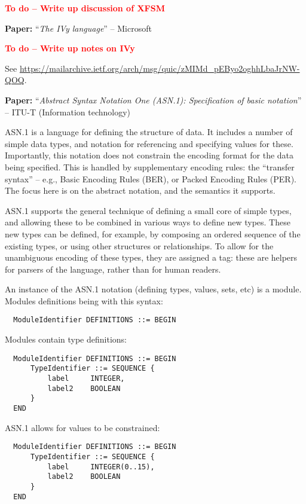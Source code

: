 \documentclass[10pt,a4paper]{article}
\newcommand{\todo}[1]{\textbf{\textcolor{red}{To do -- #1}}}
\newcommand{\paper}[3]{\vspace{4mm}\noindent\textbf{Paper:} ``\textit{#1}'' -- #2 \cite{#3}\vspace{3mm}}
\begin{document}
\todo{Write up discussion of XFSM}

\paper{The IVy language}{Microsoft}{ivyspec}

\todo{Write up notes on IVy}

See \url{https://mailarchive.ietf.org/arch/msg/quic/zMIMd_pEByo2oghhLbaJrNW-QOQ}.

\paper{Abstract Syntax Notation One (ASN.1): Specification of basic notation}{ITU-T (Information technology)}{x680}

ASN.1 is a language for defining the structure of data. It includes a number of simple
data types, and notation for referencing and specifying values for these. Importantly,
this notation does not constrain the encoding format for the data being specified. This
is handled by supplementary encoding rules: the ``transfer syntax'' -- e.g., Basic
Encoding Rules (BER), or Packed Encoding Rules (PER). The focus here is on the abstract
notation, and the semantics it supports.

ASN.1 supports the general technique of defining a small core of simple types, and
allowing these to be combined in various ways to define new types. These new types can
be defined, for example, by composing an ordered sequence of the existing types, or using
other structures or relationships. To allow for the unambiguous encoding of these types,
they are assigned a tag: these are helpers for parsers of the language, rather than for
human readers.

An instance of the ASN.1 notation (defining types, values, sets, etc) is a
module. Modules definitions being with this syntax:

\begin{verbatim}
  ModuleIdentifier DEFINITIONS ::= BEGIN
\end{verbatim}

Modules contain type definitions:

\begin{verbatim}
  ModuleIdentifier DEFINITIONS ::= BEGIN
      TypeIdentifier ::= SEQUENCE {
          label     INTEGER,
          label2    BOOLEAN
      }
  END
\end{verbatim}

ASN.1 allows for values to be constrained:

\begin{verbatim}
  ModuleIdentifier DEFINITIONS ::= BEGIN
      TypeIdentifier ::= SEQUENCE {
          label     INTEGER(0..15),
          label2    BOOLEAN
      }
  END  
\end{verbatim}
\end{document}
